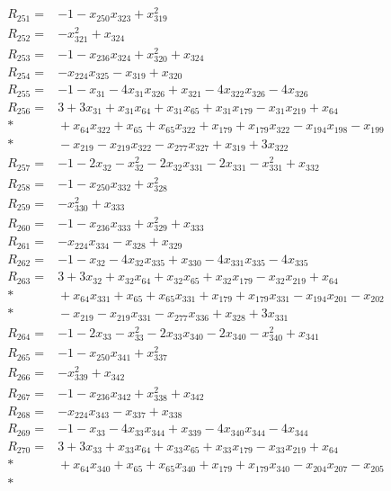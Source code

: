 \begin{align*}
R_{251}={}&-1-x_{250}x_{323}+x_{319}^{2}\\[3pt]
R_{252}={}&-x_{321}^{2}+x_{324}\\[3pt]
R_{253}={}&-1-x_{236}x_{324}+x_{320}^{2}+x_{324}\\[3pt]
R_{254}={}&-x_{224}x_{325}-x_{319}+x_{320}\\[3pt]
R_{255}={}&-1-x_{31}-4x_{31}x_{326}+x_{321}-4x_{322}x_{326}-4x_{326}\\[3pt]
R_{256}={}&3+3x_{31}+x_{31}x_{64}+x_{31}x_{65}+x_{31}x_{179}-x_{31}x_{219}+x_{64}\\*
&{}+x_{64}x_{322}+x_{65}+x_{65}x_{322}+x_{179}+x_{179}x_{322}-x_{194}x_{198}-x_{199}\\*
&{}-x_{219}-x_{219}x_{322}-x_{277}x_{327}+x_{319}+3x_{322}\\[3pt]
R_{257}={}&-1-2x_{32}-x_{32}^{2}-2x_{32}x_{331}-2x_{331}-x_{331}^{2}+x_{332}\\[3pt]
R_{258}={}&-1-x_{250}x_{332}+x_{328}^{2}\\[3pt]
R_{259}={}&-x_{330}^{2}+x_{333}\\[3pt]
R_{260}={}&-1-x_{236}x_{333}+x_{329}^{2}+x_{333}\\[3pt]
R_{261}={}&-x_{224}x_{334}-x_{328}+x_{329}\\[3pt]
R_{262}={}&-1-x_{32}-4x_{32}x_{335}+x_{330}-4x_{331}x_{335}-4x_{335}\\[3pt]
R_{263}={}&3+3x_{32}+x_{32}x_{64}+x_{32}x_{65}+x_{32}x_{179}-x_{32}x_{219}+x_{64}\\*
&{}+x_{64}x_{331}+x_{65}+x_{65}x_{331}+x_{179}+x_{179}x_{331}-x_{194}x_{201}-x_{202}\\*
&{}-x_{219}-x_{219}x_{331}-x_{277}x_{336}+x_{328}+3x_{331}\\[3pt]
R_{264}={}&-1-2x_{33}-x_{33}^{2}-2x_{33}x_{340}-2x_{340}-x_{340}^{2}+x_{341}\\[3pt]
R_{265}={}&-1-x_{250}x_{341}+x_{337}^{2}\\[3pt]
R_{266}={}&-x_{339}^{2}+x_{342}\\[3pt]
R_{267}={}&-1-x_{236}x_{342}+x_{338}^{2}+x_{342}\\[3pt]
R_{268}={}&-x_{224}x_{343}-x_{337}+x_{338}\\[3pt]
R_{269}={}&-1-x_{33}-4x_{33}x_{344}+x_{339}-4x_{340}x_{344}-4x_{344}\\[3pt]
R_{270}={}&3+3x_{33}+x_{33}x_{64}+x_{33}x_{65}+x_{33}x_{179}-x_{33}x_{219}+x_{64}\\*
&{}+x_{64}x_{340}+x_{65}+x_{65}x_{340}+x_{179}+x_{179}x_{340}-x_{204}x_{207}-x_{205}\\*

\end{align*}
